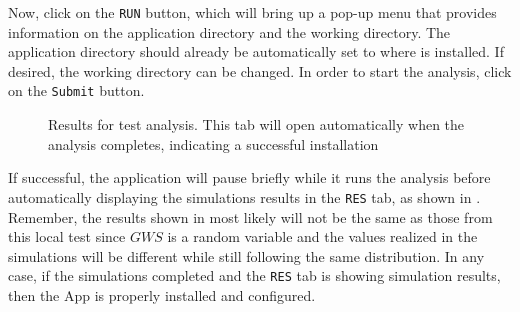 Now, click on the \texttt{RUN} button, which will bring up a pop-up
menu that provides information on the application directory and
the working directory. The application directory should already be
automatically set to where \texttt{\getsoftwarename{}} is installed.
If desired, the working directory can be changed. In order to start
the analysis, click on the \texttt{Submit} button.

\begin{figure}[!htbp]
  \caption{Results for test analysis. This tab will open automatically
  when the analysis completes, indicating a successful installation}
  \label{fig:show_results}
\end{figure}



If successful, the application will pause briefly while it runs the
analysis before automatically displaying the simulations results in
the \texttt{RES} tab, as shown
in . Remember, the results shown
in  most likely will not be the same as
those from this local test since $GWS$ is a random variable and
the values realized in the simulations will be different while still
following the same distribution. In any case, if the simulations
completed and the \texttt{RES} tab is showing simulation results, then
the \texttt{\getsoftwarename{}} App is properly installed and configured.
